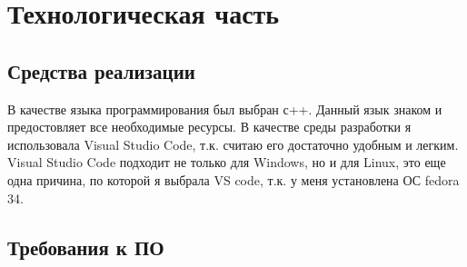 \documentclass[12pt,a4paper]{report}
\begin{document}








\newpage
\chapter{Технологическая часть} 

\section{Средства реализации}
В качестве языка программирования был выбран с++. Данный язык знаком и предостовляет все необходимые ресурсы.
В качестве среды разработки я использовала Visual Studio Code, т.к. считаю его достаточно удобным и легким.
Visual Studio Code подходит не только для  Windows, но и для Linux, это еще одна причина, по которой я выбрала VS code, т.к. у меня установлена ОС  fedora 34.

\section{Требования к ПО}
\end{document}
